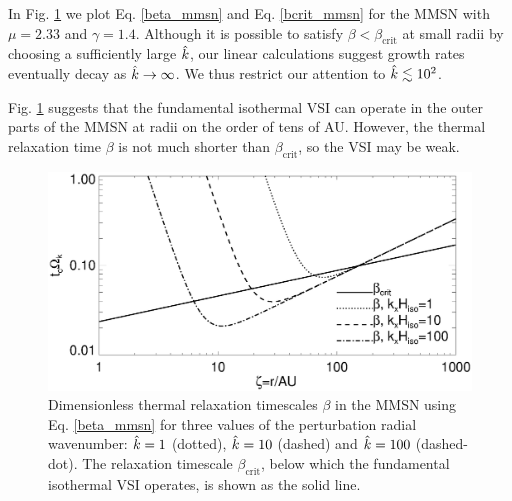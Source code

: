 In Fig. \ref{mmsn_bcrit_bcool} we plot Eq. \ref{beta_mmsn} and
Eq. \ref{bcrit_mmsn} for the MMSN with $\mu = 2.33$ and
$\gamma=1.4$. Although it is possible to satisfy
$\beta<\beta_\mathrm{crit}$ at small radii by choosing a sufficiently
large $\hat{k}$, our linear calculations suggest growth rates eventually
decay as $\hat{k}\to\infty$. We thus restrict our attention to
$\hat{k}\lesssim 10^2$. 

Fig. \ref{mmsn_bcrit_bcool} suggests that the fundamental isothermal
VSI can operate in the outer parts of the MMSN at radii on the order
of tens of AU. However, the thermal relaxation time $\beta$ is not
much shorter than $\beta_\mathrm{crit}$, so the VSI may be
weak.   

\begin{figure}
  \includegraphics[width=\linewidth]{figures/bcrit_mmsn}  
  \caption{Dimensionless thermal relaxation timescales $\beta$ in the MMSN
    using Eq. \ref{beta_mmsn} for three values of the 
    perturbation radial wavenumber: $\hat{k}=1$ (dotted), $\hat{k}=10$
    (dashed) and $\hat{k}=100$ (dashed-dot). The relaxation timescale
    $\beta_\mathrm{crit}$, below which the fundamental isothermal VSI
    operates, is shown as the solid line. 
    \label{mmsn_bcrit_bcool}}   
\end{figure}  

